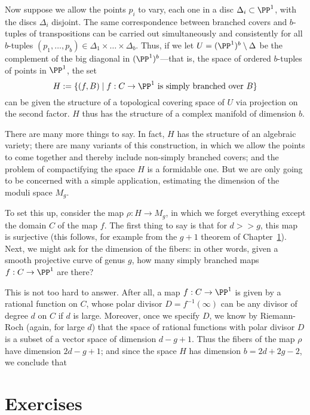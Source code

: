 Now suppose we allow the points $p_i$ to vary, each one in a disc $\Delta_i \subset \PP^1$, with the discs $\Delta_i$ disjoint. The same correspondence between branched covers and $b$-tuples of transpositions can be carried out simultaneously and consistently for all $b$-tuples $(p_1,\dots, p_b) \in \Delta_1 \times \dots \times \Delta_b$. Thus, if we let $U = (\PP^1)^b \setminus \Delta$ be the complement of the big diagonal in $(\PP^1)^b$---that is, the space of ordered $b$-tuples of points in $\PP^1$, the set
$$
H := \{ (f, B) \mid f : C \to \PP^1 \text{ is simply branched over } B \}
$$
can be given the structure of a topological covering space of $U$ via projection on the second factor. $H$ thus has the structure of a complex manifold of dimension $b$.

There are many more things to say. In fact, $H$ has the structure of an algebraic variety; there are many variants of this construction, in which we allow the points to come together and thereby include non-simply branched covers; and the problem of compactifying the space $H$ is a formidable one. But we are only going to be concerned with a simple application, estimating the dimension of the moduli space $M_g$.

To set this up, consider the map $\rho : H \to M_g$, in which we forget everything except the domain $C$ of the map $f$. The first thing to say is that for $d >> g$, this map is surjective (this follows, for example from the $g+1$ theorem of Chapter~\ref{}). Next, we might ask for the dimension of the fibers: in other words, given a smooth projective curve of genus $g$, how many simply branched maps $f : C \to \PP^1$ are there?

This is not too hard to answer. After all, a map $f : C \to \PP^1$ is given by a rational function on $C$, whose polar divisor $D = f^{-1}(\infty)$ can be any divisor of degree $d$ on $C$ if $d$ is large. Moreover, once we specify $D$, we know by Riemann-Roch (again, for large $d$) that the space of rational functions with polar divisor $D$ is a subset of a vector space of dimension $d-g+1$. Thus the fibers of the map $\rho$ have dimension $2d-g+1$; and since the space $H$ has dimension $b = 2d+2g-2$, we conclude that






\section{Exercises}


